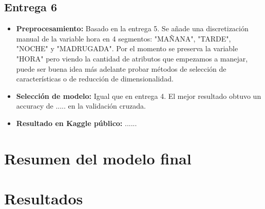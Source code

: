 \subsection{Entrega 6}
\begin{itemize}
\item \textbf{Preprocesamiento:} Basado en la entrega 5. Se añade una discretización manual de la variable hora en 4 segmentos: "MAÑANA", "TARDE", "NOCHE" y "MADRUGADA". Por el momento se preserva la variable "HORA" pero viendo la cantidad de atributos que empezamos a manejar, puede ser buena idea más adelante probar métodos de selección de características o de reducción de dimensionalidad.
\item \textbf{Selección de modelo:} Igual que en entrega 4. El mejor resultado obtuvo un accuracy de ..... en la validación cruzada.
\item \textbf{Resultado en Kaggle público:} ......
\end{itemize}

\section{Resumen del modelo final}
\section{Resultados}

